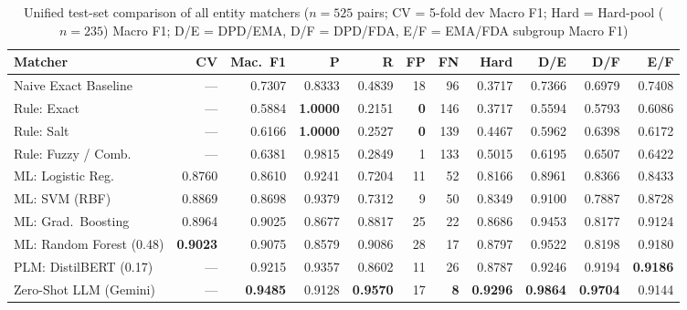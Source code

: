 \documentclass{llncs}
\begin{document}
\begin{table}[htbp]
\centering
\caption{Unified test-set comparison of all entity matchers ($n = 525$ pairs; CV = 5-fold dev Macro F1; Hard = Hard-pool ($n = 235$) Macro F1; D/E = DPD/EMA, D/F = DPD/FDA, E/F = EMA/FDA subgroup Macro F1)}
\label{tab:all_matchers}
\scriptsize
\setlength{\tabcolsep}{1.6pt}
\begin{tabularx}{\textwidth}{|>{\raggedright\arraybackslash}X|r|r|r|r|r|r|r|r|r|r|}
\hline
\textbf{Matcher} & \textbf{CV} & \textbf{Mac.\ F1} & \textbf{P} & \textbf{R} & \textbf{FP} & \textbf{FN} & \textbf{Hard} & \textbf{D/E} & \textbf{D/F} & \textbf{E/F} \\
\hline
Naive Exact Baseline   & ---    & 0.7307 & 0.8333 & 0.4839 & 18 &  96 & 0.3717 & 0.7366 & 0.6979 & 0.7408 \\
Rule: Exact            & ---    & 0.5884 & \textbf{1.0000} & 0.2151 & \textbf{0} & 146 & 0.3717 & 0.5594 & 0.5793 & 0.6086 \\
Rule: Salt             & ---    & 0.6166 & \textbf{1.0000} & 0.2527 & \textbf{0} & 139 & 0.4467 & 0.5962 & 0.6398 & 0.6172 \\
Rule: Fuzzy / Comb.    & ---    & 0.6381 & 0.9815 & 0.2849 &  1 & 133 & 0.5015 & 0.6195 & 0.6507 & 0.6422 \\
\hline
ML: Logistic Reg.      & 0.8760 & 0.8610 & 0.9241 & 0.7204 & 11 &  52 & 0.8166 & 0.8961 & 0.8366 & 0.8433 \\
ML: SVM (RBF)          & 0.8869 & 0.8698 & 0.9379 & 0.7312 &  9 &  50 & 0.8349 & 0.9100 & 0.7887 & 0.8728 \\
ML: Grad.\ Boosting    & 0.8964 & 0.9025 & 0.8677 & 0.8817 & 25 &  22 & 0.8686 & 0.9453 & 0.8177 & 0.9124 \\
ML: Random Forest (0.48) & \textbf{0.9023} & 0.9075 & 0.8579 & 0.9086 & 28 &  17 & 0.8797 & 0.9522 & 0.8198 & 0.9180 \\
\hline
PLM: DistilBERT (0.17) & ---    & 0.9215 & 0.9357 & 0.8602 & 11 &  26 & 0.8787 & 0.9246 & 0.9194 & \textbf{0.9186} \\
Zero-Shot LLM (Gemini) & ---    & \textbf{0.9485} & 0.9128 & \textbf{0.9570} & 17 & \textbf{8} & \textbf{0.9296} & \textbf{0.9864} & \textbf{0.9704} & 0.9144 \\
\hline
\end{tabularx}
\end{table}
\end{document}
